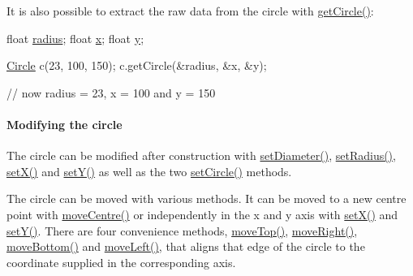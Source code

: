 It is also possible to extract the raw data from the circle with \hyperlink{classprism_1_1geometry_1_1_circle_aa670497376488f555bbbde0692ea1333}{get\+Circle()}\+:


\begin{DoxyCode}
\textcolor{keywordtype}{float} \hyperlink{classprism_1_1geometry_1_1_circle_aef97382c1f0b09dca59a0534ac03ed1b}{radius};
\textcolor{keywordtype}{float} \hyperlink{classprism_1_1geometry_1_1_circle_aeb38df0ed8d1b3b84c4eb42b50a05348}{x};
\textcolor{keywordtype}{float} \hyperlink{classprism_1_1geometry_1_1_circle_aea5997071a76ee672b6b7ec0908ebe11}{y};

\hyperlink{classprism_1_1geometry_1_1_circle_a7d9e34947cf139b50f5730ed7711b4a4}{Circle} c(23, 100, 150);
c.getCircle(&radius, &x, &y);

\textcolor{comment}{// now radius = 23, x = 100 and y = 150}
\end{DoxyCode}


\paragraph*{Modifying the circle}

The circle can be modified after construction with \hyperlink{classprism_1_1geometry_1_1_circle_a2cccd7bd93d5522b95e9b61a615e5d5b}{set\+Diameter()}, \hyperlink{classprism_1_1geometry_1_1_circle_ac09a0b4d6b1603b8da53fb8c4b6968b2}{set\+Radius()}, \hyperlink{classprism_1_1geometry_1_1_circle_a941a990726b98aad91d8a1e462919078}{set\+X()} and \hyperlink{classprism_1_1geometry_1_1_circle_adcd2f40040d78de715d3cb1f7cef3ce0}{set\+Y()} as well as the two \hyperlink{classprism_1_1geometry_1_1_circle_a2fd9a16d24f310e4dddbcd8ca2b93d60}{set\+Circle()} methods.

The circle can be moved with various methods. It can be moved to a new centre point with \hyperlink{classprism_1_1geometry_1_1_circle_a95e440e954c78f8e9e407c816948daac}{move\+Centre()} or independently in the x and y axis with \hyperlink{classprism_1_1geometry_1_1_circle_a941a990726b98aad91d8a1e462919078}{set\+X()} and \hyperlink{classprism_1_1geometry_1_1_circle_adcd2f40040d78de715d3cb1f7cef3ce0}{set\+Y()}. There are four convenience methods, \hyperlink{classprism_1_1geometry_1_1_circle_ac95e8868af4ea96a7593d52a7357f2f9}{move\+Top()}, \hyperlink{classprism_1_1geometry_1_1_circle_a8f51014f0b8c2dffcf0718fbd7d585f0}{move\+Right()}, \hyperlink{classprism_1_1geometry_1_1_circle_ad72079c73cfb8cf3426e23aa64c574e4}{move\+Bottom()} and \hyperlink{classprism_1_1geometry_1_1_circle_a1e885c1237cbc61bfaece2f31b756a67}{move\+Left()}, that aligns that edge of the circle to the coordinate supplied in the corresponding axis.


